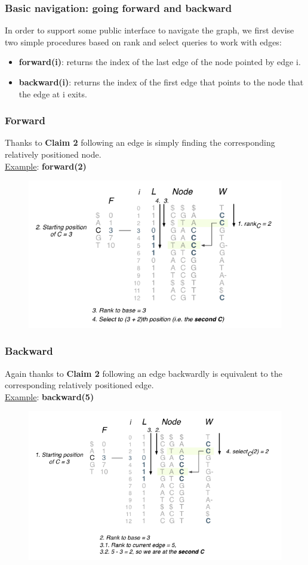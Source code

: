 \begin{frame}
\frametitle{Basic navigation: going forward and backward}
In order to support some public interface to navigate the graph, we first devise two simple procedures based on rank and select queries to work with edges: 
\begin{itemize}
	\item \textbf{forward(i)}: returns the index of the last edge of the node pointed by edge i.
	\item \textbf{backward(i)}: returns the index of the first edge that points to the node that the edge at i exits. 	
\end{itemize}
\end{frame}


\begin{frame}
\frametitle{Forward}
Thanks to \textbf{Claim 2} following an edge is simply finding the corresponding relatively positioned node. \\
\underline{Example}: \textbf{forward(2)}
\begin{figure}
	\includegraphics[scale=0.4]{img/fwd.png}
\end{figure}
\end{frame}

\begin{frame}
\frametitle{Backward}
Again thanks to \textbf{Claim 2} following an edge backwardly is equivalent to the corresponding relatively positioned edge. \\
\underline{Example}: \textbf{backward(5)}
\begin{figure}
	\includegraphics[scale=0.4]{img/bwd.png}
\end{figure}
\end{frame}


